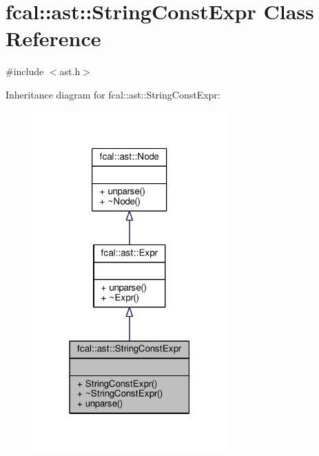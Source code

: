 \hypertarget{classfcal_1_1ast_1_1StringConstExpr}{}\section{fcal\+:\+:ast\+:\+:String\+Const\+Expr Class Reference}
\label{classfcal_1_1ast_1_1StringConstExpr}


{\ttfamily \#include $<$ast.\+h$>$}



Inheritance diagram for fcal\+:\+:ast\+:\+:String\+Const\+Expr\+:
\nopagebreak
\begin{figure}[H]
\begin{center}
\leavevmode
\includegraphics[width=210pt]{classfcal_1_1ast_1_1StringConstExpr__inherit__graph}
\end{center}
\end{figure}


